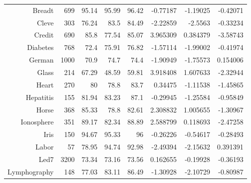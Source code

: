 \documentclass[11pt,fleqn]{article}
\begin{document}
\begin{enumerate}
\begin{tabular}{rrrrrrrr}
    Breadt &        699 &      95.14 &      95.99 &      96.42 &   -0.77187 &   -1.19025 &   -0.42071 \\

     Cleve &        303 &      76.24 &       83.5 &      84.49 &   -2.22859 &    -2.5563 &   -0.33234 \\

    Credit &        690 &       85.8 &      77.54 &      85.07 &   3.965309 &   0.384379 &   -3.58743 \\

  Diabetes &        768 &       72.4 &      75.91 &      76.82 &   -1.57114 &   -1.99002 &   -0.41974 \\

    German &       1000 &       70.9 &       74.7 &       74.4 &   -1.90949 &   -1.75573 &   0.154006 \\

     Glass &        214 &      67.29 &      48.59 &      59.81 &   3.918408 &   1.607633 &   -2.32944 \\

     Heart &        270 &         80 &       78.8 &       83.7 &    0.34475 &   -1.11538 &   -1.45865 \\

 Hepatitis &        155 &      81.94 &      83.23 &       87.1 &   -0.29945 &   -1.25584 &   -0.95849 \\

     Horse &        368 &      85.33 &       78.8 &      82.61 &   2.308832 &   1.005655 &   -1.30967 \\

Ionosphere &        351 &      89.17 &      82.34 &      88.89 &   2.588799 &   0.118693 &   -2.47258 \\

      Iris &        150 &      94.67 &      95.33 &         96 &   -0.26226 &   -0.54617 &   -0.28493 \\

    Labor  &         57 &      78.95 &      94.74 &      92.98 &   -2.49394 &   -2.15632 &   0.391391 \\

      Led7 &       3200 &      73.34 &      73.16 &      73.56 &   0.162655 &   -0.19928 &   -0.36193 \\

Lymphography &        148 &      77.03 &      83.11 &      86.49 &   -1.30928 &   -2.10729 &   -0.80987 \\


\end{tabular}
\end{enumerate}
\end{document}
